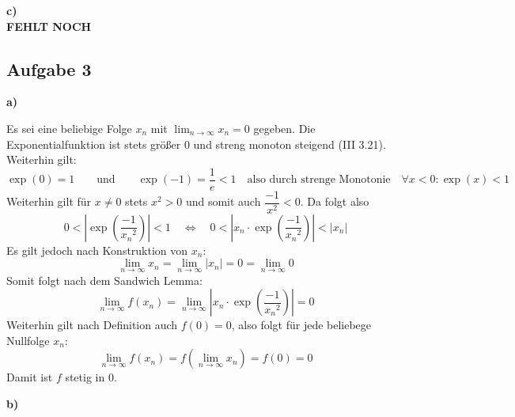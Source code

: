 \documentclass[a4paper,graphics,11pt]{article}
\newcommand{\aufgabe}[1]{\subsection*{Aufgabe #1}}
\begin{document}
\textbf{c)}\\
\textbf{FEHLT NOCH}


\aufgabe{3}
\textbf{a)}

Es sei eine beliebige Folge $x_n$ mit $\lim_{n \to \infty}\limits x_n = 0$ gegeben.
Die Exponentialfunktion ist stets größer 0 und streng monoton steigend (III 3.21).
Weiterhin gilt:
$$
    \exp(0) = 1
    \qquad\text{und}\qquad
    \exp(-1) = \frac{1}{e} < 1
    \quad\text{also durch strenge Monotonie}\quad
    \forall x < 0 \colon \exp(x) < 1
$$
Weiterhin gilt für $x \neq 0$ stets $x^2 > 0$ und somit auch $\dfrac{-1}{x^2} < 0$.
Da folgt also
$$
    0 < \left|\exp\left(\frac{-1}{{x_n}^2}\right)\right| < 1
    \quad \Longleftrightarrow\quad
    0 < \left|x_n\cdot\exp\left(\frac{-1}{{x_n}^2}\right)\right| < |x_n|
$$
Es gilt jedoch nach Konstruktion von $x_n\colon$
$$
    \lim_{n \to \infty}\limits x_n
    = \lim_{n \to \infty}\limits |x_n|
    = 0
    = \lim_{n \to \infty}\limits 0
$$
Somit folgt nach dem Sandwich Lemma:
$$
    \lim_{n \to \infty} f(x_n) = \lim_{n \to \infty} \left|x_n\cdot\exp\left(\frac{-1}{{x_n}^2}\right)\right| = 0
$$
Weiterhin gilt nach Definition auch $f(0) = 0$, also folgt für jede beliebege Nullfolge $x_n$:
$$
    \lim_{n \to \infty} f(x_n) = f(\lim_{n \to \infty} x_n) = f(0) = 0
$$
Damit ist $f$ stetig in 0.


\textbf{b)}
\end{document}
